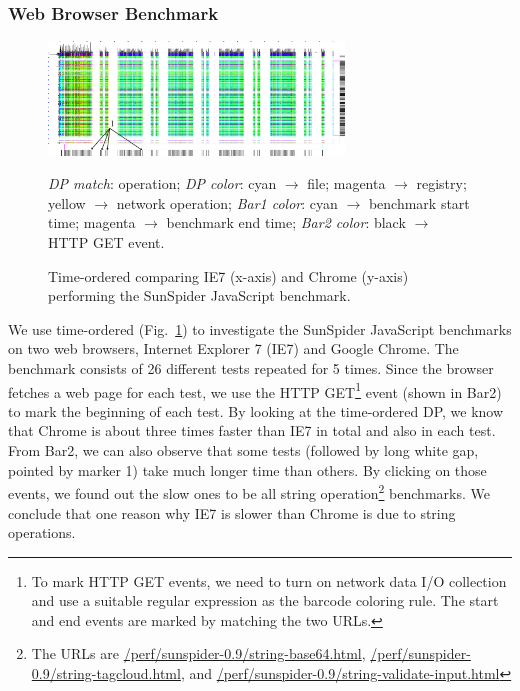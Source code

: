 \subsubsection{Web Browser Benchmark}
\label{sec:wbbench}

\begin{figure}[htb]
\begin{center}
\includegraphics[width=0.7\textwidth]{lviz/wbbench-dp.png}
\end{center}
\caption{Time-ordered \VDP{} comparing IE7 (x-axis) and Chrome (y-axis)
performing the
SunSpider JavaScript benchmark.
}
\label{fig:wbbench-dp}
{\it DP match}: operation;
{\it DP color}: cyan $\rightarrow$ file; magenta $\rightarrow$ registry;
yellow $\rightarrow$ network operation;
{\it Bar1 color}: cyan $\rightarrow$ benchmark start time;
magenta $\rightarrow$ benchmark end time;
{\it Bar2 color}: black $\rightarrow$ HTTP GET event.
\end{figure}

We use time-ordered \VDP{} (Fig.~\ref{fig:wbbench-dp}) to investigate the
SunSpider JavaScript benchmarks on
two web browsers, Internet Explorer 7 (IE7) and Google Chrome.
The benchmark consists of 26 different tests repeated for 5 times.
Since the browser fetches a web page for each test,
we use the HTTP GET\footnote{
To mark HTTP GET events, we need to turn on network data I/O collection
and use a suitable regular expression as the barcode coloring rule.
The start and end events are marked by matching the two URLs.
}
event (shown in Bar2) to mark the beginning
of each test.
By looking at the time-ordered DP, we know that Chrome is about three
times faster than IE7 in total and also in each test.
From Bar2,
we can also observe that some tests (followed by long white gap,
pointed by marker 1) take much longer time than others.
By clicking on those events, we found out the slow ones to be all string
operation\footnote{
The URLs are \url{/perf/sunspider-0.9/string-base64.html},
\url{/perf/sunspider-0.9/string-tagcloud.html},
and \url{/perf/sunspider-0.9/string-validate-input.html}}
benchmarks.
We conclude that one reason why IE7 is slower than Chrome is due to string operations.
